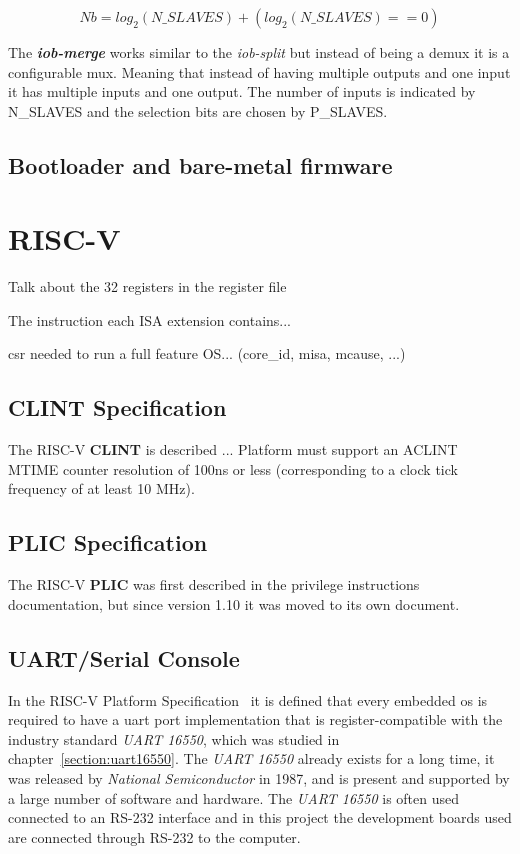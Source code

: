 \begin{equation}
    \label{eq:number_bits}
    Nb = log_2(N\_SLAVES)+(log_2(N\_SLAVES)==0)
\end{equation}

The \textbf{\textit{iob-merge}} works similar to the \textit{iob-split} but instead of being a \acrshort{demux} it is a configurable \acrfull{mux}. Meaning that instead of having multiple outputs and one input it has multiple inputs and one output. The number of inputs is indicated by N\_SLAVES and the selection bits are chosen by P\_SLAVES.

\subsection{Bootloader and bare-metal firmware}

\section{RISC-V}
\label{section:riscv}
Talk about the 32 registers in the register file

The instruction each ISA extension contains...

\acrfull{csr} needed to run a full feature OS... (core\_id, misa, mcause, ...)

\subsection{CLINT Specification}
The RISC-V \textbf{CLINT} is described ...
Platform must support an ACLINT MTIME counter resolution of 100ns or less (corresponding to a clock tick frequency of at least 10 MHz).

\subsection{PLIC Specification}
The RISC-V \textbf{PLIC} was first described in the privilege instructions documentation, but since version 1.10 it was moved to its own document.

\subsection{UART/Serial Console}
\label{section:serial_console}
In the RISC-V Platform Specification~\cite{riscv_platform_specification} it is defined that every embedded \acrfull{os} is required to have a \acrshort{uart} port implementation that is register-compatible with the industry standard \textit{UART 16550}, which was studied in chapter~\ref{section:uart16550}. The \textit{UART 16550} already exists for a long time, it was released by \textit{National Semiconductor} in 1987, and is present and supported by a large number of software and hardware. The \textit{UART 16550} is often used connected to an RS-232 interface and in this project the development boards used are connected through RS-232 to the computer.

